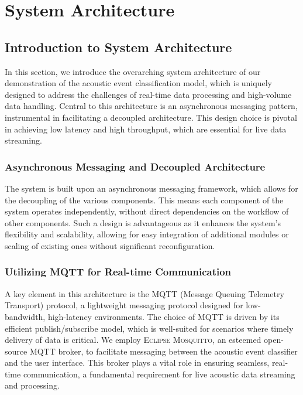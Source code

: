 \section{System Architecture}

\subsection{Introduction to System Architecture}
In this section, we introduce the overarching system architecture of our demonstration of the acoustic event classification model, which is uniquely designed to address the challenges of real-time data processing and high-volume data handling. Central to this architecture is an asynchronous messaging pattern, instrumental in facilitating a decoupled architecture. This design choice is pivotal in achieving low latency and high throughput, which are essential for live data streaming.

\subsubsection{Asynchronous Messaging and Decoupled Architecture}
The system is built upon an asynchronous messaging framework, which allows for the decoupling of the various components. This means each component of the system operates independently, without direct dependencies on the workflow of other components. Such a design is advantageous as it enhances the system's flexibility and scalability, allowing for easy integration of additional modules or scaling of existing ones without significant reconfiguration\cite{galvis2010messaging}.

\subsubsection{Utilizing MQTT for Real-time Communication}
A key element in this architecture is the MQTT (Message Queuing Telemetry Transport) protocol, a lightweight messaging protocol designed for low-bandwidth, high-latency environments\cite{hillar2017mqtt}. The choice of MQTT is driven by its efficient publish/subscribe model, which is well-suited for scenarios where timely delivery of data is critical. We employ \textsc{Eclipse Mosquitto}, an esteemed open-source MQTT broker, to facilitate messaging between the acoustic event classifier and the user interface. This broker plays a vital role in ensuring seamless, real-time communication, a fundamental requirement for live acoustic data streaming and processing.

